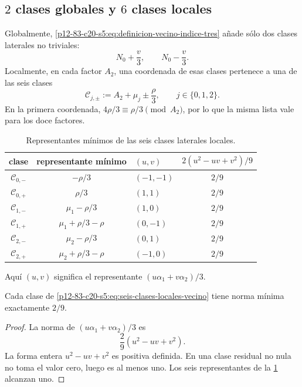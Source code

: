 \subsection{\(2\) clases globales y \(6\) clases locales}

Globalmente, \eqref{p12-83-c20-s5:eq:definicion-vecino-indice-tres} añade sólo dos clases
laterales no triviales:
\[
 N_0+\frac v3,
 \qquad
 N_0-\frac v3.
\]
Localmente, en cada factor \(A_2\), una coordenada de esas clases pertenece
a una de las seis clases
\begin{equation}
 \mathscr C_{j,\pm}
 :=A_2+\mu_j\pm\frac\rho3,
 \qquad j\in\{0,1,2\}.
 \label{p12-83-c20-s5:eq:seis-clases-locales-vecino}
\end{equation}
En la primera coordenada, \(4\rho/3\equiv\rho/3\pmod{A_2}\), por lo que
la misma lista vale para los doce factores.

\begin{table}[htbp]
\centering
\caption{Representantes mínimos de las seis clases laterales locales.}
\label{p12-83-c20-s5:tab:seis-clases-locales-vecino}
\begin{tabular}{cclc}
\toprule
clase&representante mínimo&\((u,v)\)&
\(2(u^2-uv+v^2)/9\)\\
\midrule
\(\mathscr C_{0,-}\)&\(-\rho/3\)&\((-1,-1)\)&\(2/9\)\\
\(\mathscr C_{0,+}\)&\( \rho/3\)&\((1,1)\)&\(2/9\)\\
\(\mathscr C_{1,-}\)&\( \mu_1-\rho/3\)&\((1,0)\)&\(2/9\)\\
\(\mathscr C_{1,+}\)&\( \mu_1+\rho/3-\rho\)&\((0,-1)\)&\(2/9\)\\
\(\mathscr C_{2,-}\)&\( \mu_2-\rho/3\)&\((0,1)\)&\(2/9\)\\
\(\mathscr C_{2,+}\)&\( \mu_2+\rho/3-\rho\)&\((-1,0)\)&\(2/9\)\\
\bottomrule
\end{tabular}
\end{table}

Aquí \((u,v)\) significa el representante
\((u\alpha_1+v\alpha_2)/3\).

\begin{lemma}
\label{p12-83-c20-s5:lem:minimo-seis-clases-locales}
Cada clase de \eqref{p12-83-c20-s5:eq:seis-clases-locales-vecino} tiene norma mínima
exactamente \(2/9\).
\end{lemma}

\begin{proof}
La norma de \((u\alpha_1+v\alpha_2)/3\) es
\[
 \frac29(u^2-uv+v^2).
\]
La forma entera \(u^2-uv+v^2\) es positiva definida. En una clase residual
no nula no toma el valor cero, luego es al menos uno. Los seis
representantes de la \cref{p12-83-c20-s5:tab:seis-clases-locales-vecino} alcanzan uno.
\end{proof}

